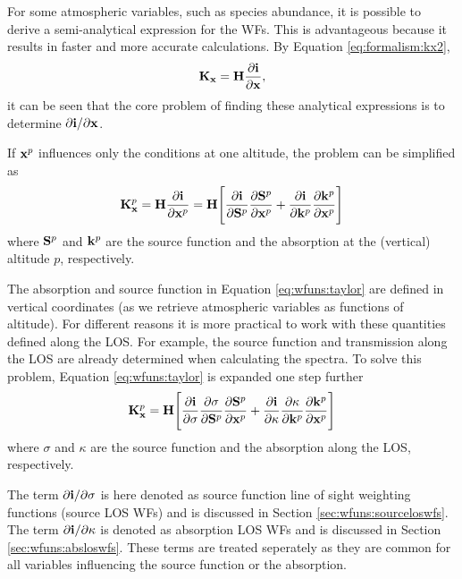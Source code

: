   For some atmospheric variables, such as species abundance, it is
  possible to derive a semi-analytical expression for the WFs. This is
  advantageous because it results in faster and more accurate
  calculations. By Equation \ref{eq:formalism:kx2},
  \begin{eqnarray*}
    \mathbf{K_x} = \mathbf{H}\frac{\partial\mathbf{i}}{\partial \mathbf{x}},
  \end{eqnarray*}
  it can be seen that the core problem of finding these analytical
  expressions is to determine $\partial\mathbf{i} / \partial \mathbf{x}$. 
  
  If $\mathbf{x}^p$ influences only the conditions at one altitude, the
  problem can be simplified as \citep[][Eq. 43]{eriksson:00a}
  \begin{equation}
    \mathbf{K}_{\mathbf{x}}^p = \mathbf{H} \frac{\partial\mathbf{i}}{\partial \mathbf{x}^p} = 
      \mathbf{H} \Bigg[ \frac{\partial\mathbf{i}}{\partial \mathbf{S}^p}
                 \frac{\partial \mathbf{S}^p}{\partial \mathbf{x}^p} +
                 \frac{\partial\mathbf{i}}{\partial \mathbf{k}^p}
                 \frac{\partial \mathbf{k}^p}{\partial \mathbf{x}^p} \Bigg]
   \label{eq:wfuns:taylor}
  \end{equation}
  where $\mathbf{S}^p$ and $\mathbf{k}^p$ are the source function and the
  absorption at the (vertical) altitude $p$, respectively.
  
  The absorption and source function in Equation \ref{eq:wfuns:taylor}
  are defined in vertical coordinates (as we retrieve atmospheric
  variables as functions of altitude). For different reasons it is
  more practical to work with these quantities defined along the LOS.
  For example, the source function and transmission along the LOS are
  already determined when calculating the spectra. To solve this
  problem, Equation \ref{eq:wfuns:taylor} is expanded one step further
  \begin{equation}
    \mathbf{K}_{\mathbf{x}}^p = \mathbf{H} \Bigg[ \frac{\partial\mathbf{i}}{\partial \sigma}
                 \frac{\partial \sigma}{\partial \mathbf{S}^p} 
                 \frac{\partial \mathbf{S}^p}{\partial \mathbf{x}^p} +
                 \frac{\partial\mathbf{i}}{\partial \kappa}
                 \frac{\partial \kappa}{\partial \mathbf{k}^p}
                 \frac{\partial \mathbf{k}^p}{\partial \mathbf{x}^p} \Bigg]
   \label{eq:wfuns:taylor2}
  \end{equation}
  where $\sigma$ and $\kappa$ are the source function and the absorption 
  along the LOS, respectively.
  
  The term $\partial\mathbf{i} / \partial \sigma$ is here denoted as source function 
  line of sight weighting functions (source LOS WFs) and is
  discussed in Section \ref{sec:wfuns:sourceloswfs}. The term
  $\partial\mathbf{i}/ \partial \kappa$ is denoted as absorption LOS WFs and
  is discussed in Section \ref{sec:wfuns:absloswfs}. These terms are
  treated seperately as they are common for all variables influencing
  the source function or the absorption.

